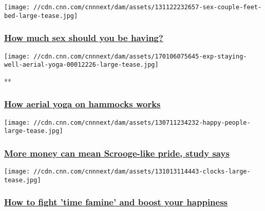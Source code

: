 \href{/2016/04/11/health/sex-frequency-happiness-research/index.html}{}

\texttt{[image: //cdn.cnn.com/cnnnext/dam/assets/131122232657-sex-couple-feet-bed-large-tease.jpg]}

\hypertarget{how-much-sex-should-you-be-having-}{%
\subsubsection{\texorpdfstring{\href{/2016/04/11/health/sex-frequency-happiness-research/index.html}{How
much sex should you be having?
}}{How much sex should you be having? }}\label{how-much-sex-should-you-be-having-}}

\href{/videos/health/2017/01/03/exp-staying-well-aerial-yoga.cnn}{}

\texttt{[image: //cdn.cnn.com/cnnnext/dam/assets/170106075645-exp-staying-well-aerial-yoga-00012226-large-tease.jpg]}

**

\hypertarget{how-aerial-yoga-on-hammocks-works}{%
\subsubsection{\texorpdfstring{\href{/videos/health/2017/01/03/exp-staying-well-aerial-yoga.cnn}{How
aerial yoga on hammocks
works}}{How aerial yoga on hammocks works}}\label{how-aerial-yoga-on-hammocks-works}}

\href{/2017/12/18/health/poor-rich-happiness-study/index.html}{}

\texttt{[image: //cdn.cnn.com/cnnnext/dam/assets/130711234232-happy-people-large-tease.jpg]}

\hypertarget{more-money-can-mean-scrooge-like-pride-study-says}{%
\subsubsection{\texorpdfstring{\href{/2017/12/18/health/poor-rich-happiness-study/index.html}{More
money can mean Scrooge-like pride, study
says}}{More money can mean Scrooge-like pride, study says}}\label{more-money-can-mean-scrooge-like-pride-study-says}}

\href{/2017/07/24/health/time-famine-stress-happiness-study/index.html}{}

\texttt{[image: //cdn.cnn.com/cnnnext/dam/assets/131013114443-clocks-large-tease.jpg]}

\hypertarget{how-to-fight-time-famine-and-boost-your-happiness}{%
\subsubsection{\texorpdfstring{\href{/2017/07/24/health/time-famine-stress-happiness-study/index.html}{How
to fight 'time famine' and boost your
happiness}}{How to fight 'time famine' and boost your happiness}}\label{how-to-fight-time-famine-and-boost-your-happiness}}

